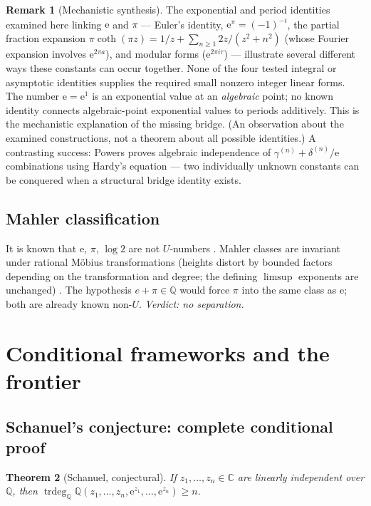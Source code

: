 \documentclass[11pt]{amsart}
\newtheorem{theorem}{Theorem}[section]
\theoremstyle{definition}
\newtheorem{remark}[theorem]{Remark}
\theoremstyle{remark}
\numberwithin{equation}{section}
\newcommand{\Q}{\mathbb{Q}}
\newcommand{\C}{\mathbb{C}}
\newcommand{\trdeg}{\operatorname{trdeg}}
\newcommand{\ee}{\mathrm{e}}
\begin{document}
\begin{remark}[Mechanistic synthesis]
The exponential and period identities examined here linking $\ee$ and $\pi$ --- Euler's identity, $\ee^\pi=(-1)^{-i}$, the partial fraction expansion $\pi\coth(\pi z)=1/z+\sum_{n\ge1}2z/(z^2+n^2)$ (whose Fourier expansion involves $\ee^{2\pi a}$), and modular forms ($\ee^{2\pi i\tau}$) --- illustrate several different ways these constants can occur together. None of the four tested integral or asymptotic identities supplies the required small nonzero integer linear forms. The number $\ee=\ee^1$ is an exponential value at an \emph{algebraic} point; no known identity connects algebraic-point exponential values to periods additively. This is the mechanistic explanation of the missing bridge. (An observation about the examined constructions, not a theorem about all possible identities.) A contrasting success: Powers \cite{Powers2025} proves algebraic independence of $\gamma^{(n)}+\delta^{(n)}/\ee$ combinations using Hardy's equation --- two individually unknown constants can be conquered when a structural bridge identity exists.
\end{remark}

\subsection{Mahler classification}

It is known that $\ee$, $\pi$, $\log2$ are not $U$-numbers \cite{KepuAlgebraic}. Mahler classes are invariant under rational M\"obius transformations (heights distort by bounded factors depending on the transformation and degree; the defining $\limsup$ exponents are unchanged) \cite{Baker,HuberWustholz2022}. The hypothesis $e+\pi\in\Q$ would force $\pi$ into the same class as $\ee$; both are already known non-$U$. \emph{Verdict: no separation.}

\section{Conditional frameworks and the frontier}\label{sec:conditional}

\subsection{Schanuel's conjecture: complete conditional proof}

\begin{theorem}[Schanuel, conjectural]\label{thm:schanuel}
If $z_1,\dots,z_n\in\C$ are linearly independent over $\Q$, then $\trdeg_\Q\Q(z_1,\dots,z_n,\ee^{z_1},\dots,\ee^{z_n})\ge n$.
\end{theorem}
\end{document}
